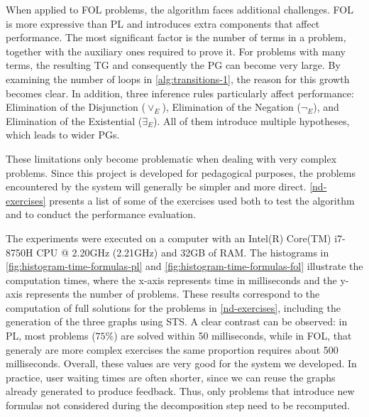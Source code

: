 When applied to \gls{FOL} problems, the algorithm faces additional challenges. \gls{FOL} is more expressive than \gls{PL} and introduces extra components that affect performance. The most significant factor is the number of terms in a problem, together with the auxiliary ones required to prove it. For problems with many terms, the resulting \gls{TG} and consequently the \gls{PG} can become very large. By examining the number of loops in \autoref{alg:transitions-1}, the reason for this growth becomes clear. In addition, three inference rules particularly affect performance: Elimination of the Disjunction (\(\vee_E\)), Elimination of the Negation (\(\lnot_E\)), and Elimination of the Existential (\(\exists_E\)). All of them introduce multiple hypotheses, which leads to wider \gls{PG}s.

These limitations only become problematic when dealing with very complex problems. Since this project is developed for pedagogical purposes, the problems encountered by the system will generally be simpler and more direct. \autoref{nd-exercises} presents a list of some of the exercises used both to test the algorithm and to conduct the performance evaluation.

The experiments were executed on a computer with an Intel(R) Core(TM) i7-8750H CPU @ 2.20GHz (2.21GHz) and 32GB of RAM. The histograms in \autoref{fig:histogram-time-formulas-pl} and \autoref{fig:histogram-time-formulas-fol} illustrate the computation times, where the x-axis represents time in milliseconds and the y-axis represents the number of problems. These results correspond to the computation of full solutions for the problems in \autoref{nd-exercises}, including the generation of the three graphs using \gls{STS}. A clear contrast can be observed: in \gls{PL}, most problems (\(75\%\)) are solved within 50 milliseconds, while in \gls{FOL}, that generaly are more complex exercises the same proportion requires about 500 milliseconds. Overall, these values are very good for the system we developed. In practice, user waiting times are often shorter, since we can reuse the graphs already generated to produce feedback. Thus, only problems that introduce new formulas not considered during the decomposition step need to be recomputed.


